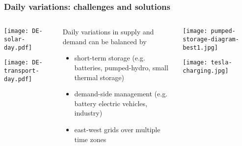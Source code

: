 \documentclass[10pt,aspectratio=169,dvipsnames]{beamer}
\let\olditem\item
\renewcommand{\item}{%
\olditem\vspace{5pt}}
\begin{document}
\begin{frame}
  \frametitle{Daily variations: challenges and solutions}

  \begin{columns}[T]
    \begin{column}{5cm}
      \texttt{[image: DE-solar-day.pdf]}

      \texttt{[image: DE-transport-day.pdf]}
    \end{column}
    \begin{column}{4cm}
      \alert{Daily} variations in supply and demand can be balanced by
      \begin{itemize}
      \item \alert{short-term storage} (e.g. batteries, pumped-hydro, small thermal storage)
      \item \alert{demand-side management} (e.g. battery electric vehicles,
        industry)
      \item \alert{east-west grids over multiple time zones}
      \end{itemize}

    \end{column}
    \begin{column}{5cm}
      \texttt{[image: pumped-storage-diagram-best1.jpg]}

      \vspace{.5cm}

      \texttt{[image: tesla-charging.jpg]}
    \end{column}
  \end{columns}

\end{frame}
\end{document}
